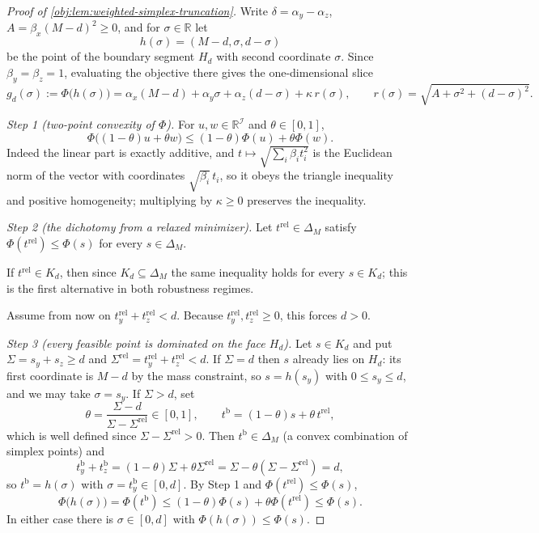 \documentclass[11pt]{article}
\begin{document}
\begin{proof}[Proof of \cref{obj:lem:weighted-simplex-truncation}]
Write \(\delta=\alpha_y-\alpha_z\), \(A=\beta_x(M-d)^2\ge0\), and for \(\sigma\in\mathbb R\) let
\[
h(\sigma)=(M-d,\sigma,d-\sigma)
\]
be the point of the boundary segment \(H_d\) with second coordinate \(\sigma\).  Since \(\beta_y=\beta_z=1\), evaluating the objective there gives the one-dimensional slice
\[
g_d(\sigma):=\Phi\bigl(h(\sigma)\bigr)
=\alpha_x(M-d)+\alpha_y\sigma+\alpha_z(d-\sigma)
+\kappa\,r(\sigma),
\qquad
r(\sigma)=\sqrt{A+\sigma^2+(d-\sigma)^2}.
\]

\emph{Step 1 (two-point convexity of \(\Phi\)).}  For \(u,w\in\mathbb R^{\mathcal I}\) and \(\theta\in[0,1]\),
\[
\Phi\bigl((1-\theta)u+\theta w\bigr)\le(1-\theta)\Phi(u)+\theta\Phi(w).
\]
Indeed the linear part is exactly additive, and \(t\mapsto\sqrt{\sum_i\beta_it_i^2}\) is the Euclidean norm of the vector with coordinates \(\sqrt{\beta_i}\,t_i\), so it obeys the triangle inequality and positive homogeneity; multiplying by \(\kappa\ge0\) preserves the inequality. %

\emph{Step 2 (the dichotomy from a relaxed minimizer).}  Let \(t^{\mathrm{rel}}\in\Delta_M\) satisfy \(\Phi(t^{\mathrm{rel}})\le\Phi(s)\) for every \(s\in\Delta_M\).

If \(t^{\mathrm{rel}}\in K_d\), then since \(K_d\subseteq\Delta_M\) the same inequality holds for every \(s\in K_d\); this is the first alternative in both robustness regimes. %

Assume from now on \(t^{\mathrm{rel}}_y+t^{\mathrm{rel}}_z<d\).  Because \(t^{\mathrm{rel}}_y,t^{\mathrm{rel}}_z\ge0\), this forces \(d>0\).

\emph{Step 3 (every feasible point is dominated on the face \(H_d\)).}  Let \(s\in K_d\) and put \(\Sigma=s_y+s_z\ge d\) and \(\Sigma^{\mathrm{rel}}=t^{\mathrm{rel}}_y+t^{\mathrm{rel}}_z<d\).  If \(\Sigma=d\) then \(s\) already lies on \(H_d\): its first coordinate is \(M-d\) by the mass constraint, so \(s=h(s_y)\) with \(0\le s_y\le d\), and we may take \(\sigma=s_y\).  If \(\Sigma>d\), set
\[
\theta=\frac{\Sigma-d}{\Sigma-\Sigma^{\mathrm{rel}}}\in[0,1],
\qquad
t^{\mathrm b}=(1-\theta)s+\theta\,t^{\mathrm{rel}} ,
\]
which is well defined since \(\Sigma-\Sigma^{\mathrm{rel}}>0\).  Then \(t^{\mathrm b}\in\Delta_M\) (a convex combination of simplex points) and
\[
t^{\mathrm b}_y+t^{\mathrm b}_z=(1-\theta)\Sigma+\theta\Sigma^{\mathrm{rel}}=\Sigma-\theta(\Sigma-\Sigma^{\mathrm{rel}})=d,
\]
so \(t^{\mathrm b}=h(\sigma)\) with \(\sigma=t^{\mathrm b}_y\in[0,d]\).  By Step 1 and \(\Phi(t^{\mathrm{rel}})\le\Phi(s)\),
\[
\Phi\bigl(h(\sigma)\bigr)=\Phi(t^{\mathrm b})
\le(1-\theta)\Phi(s)+\theta\Phi(t^{\mathrm{rel}})
\le\Phi(s).
\]
In either case there is \(\sigma\in[0,d]\) with \(\Phi(h(\sigma))\le\Phi(s)\). %


\end{proof}
\end{document}
